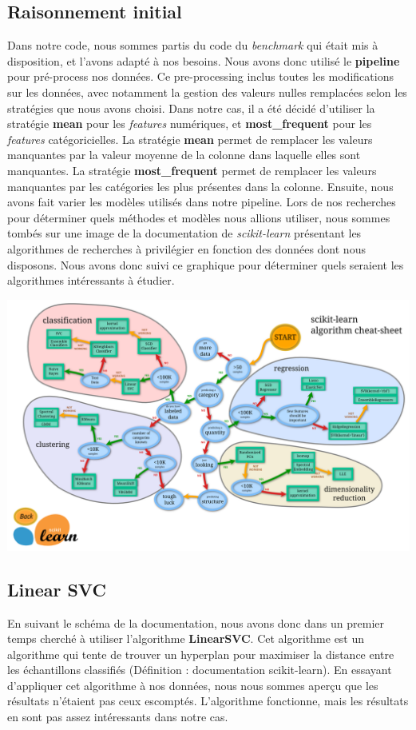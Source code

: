 \documentclass[../rapport.tex]{subfiles}
\begin{document}
\subsection{Raisonnement initial}
Dans notre code, nous sommes partis du code du \textit{benchmark} qui était mis à disposition, et l'avons adapté à nos besoins. 
Nous avons donc utilisé le \textbf{pipeline} pour pré-process nos données. 
Ce pre-processing inclus toutes les modifications sur les données, avec notamment la gestion des valeurs nulles remplacées selon les stratégies que nous avons choisi. 
Dans notre cas, il a été décidé d'utiliser la stratégie \textbf{mean} pour les \textit{features} numériques, et \textbf{most\_frequent} pour les \textit{features} catégoricielles. 
La stratégie \textbf{mean} permet de remplacer les valeurs manquantes par la valeur moyenne de la colonne dans laquelle elles sont manquantes.
La stratégie \textbf{most\_frequent} permet de remplacer les valeurs manquantes par les catégories les plus présentes dans la colonne.
Ensuite, nous avons fait varier les modèles utilisés dans notre pipeline. 
Lors de nos recherches pour déterminer quels méthodes et modèles nous allions utiliser, nous sommes tombés sur une image de la documentation de \textit{scikit-learn} présentant les algorithmes de recherches à privilégier en fonction des données dont nous disposons. Nous avons donc suivi ce graphique pour déterminer quels seraient les algorithmes intéressants à étudier.

\includegraphics[scale=0.1]{images/ml_map.png}

\subsection{Linear SVC}
En suivant le schéma de la documentation, nous avons donc dans un premier temps cherché à utiliser l'algorithme \textbf{LinearSVC}. 
Cet algorithme est un algorithme qui tente de trouver un hyperplan pour maximiser la distance entre les échantillons classifiés (Définition : documentation scikit-learn).
En essayant d'appliquer cet algorithme à nos données, nous nous sommes aperçu que les résultats n'étaient pas ceux escomptés. 
L'algorithme fonctionne, mais les résultats en sont pas assez intéressants dans notre cas.
\end{document}
